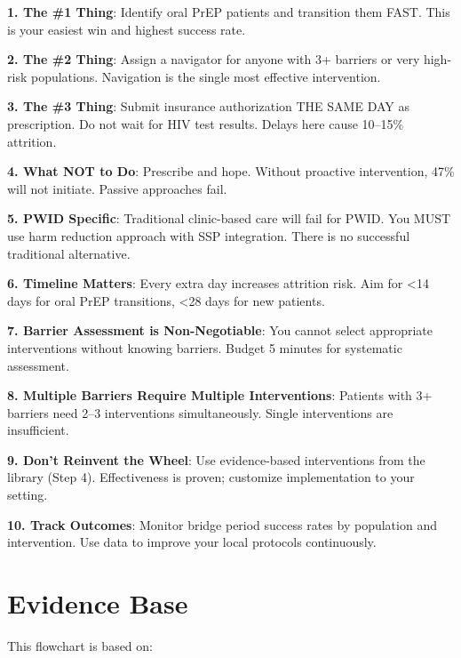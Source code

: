 \documentclass[11pt]{article}
\begin{document}
\begin{tcolorbox}[colback=yellow!10!white,colframe=yellow!75!black,title=\textbf{Top 10 Implementation Insights},breakable]

\textbf{1. The \#1 Thing}: Identify oral PrEP patients and transition them FAST. This is your easiest win and highest success rate.

\textbf{2. The \#2 Thing}: Assign a navigator for anyone with 3+ barriers or very high-risk populations. Navigation is the single most effective intervention.

\textbf{3. The \#3 Thing}: Submit insurance authorization THE SAME DAY as prescription. Do not wait for HIV test results. Delays here cause 10--15\% attrition.

\textbf{4. What NOT to Do}: Prescribe and hope. Without proactive intervention, 47\% will not initiate. Passive approaches fail.

\textbf{5. PWID Specific}: Traditional clinic-based care will fail for PWID. You MUST use harm reduction approach with SSP integration. There is no successful traditional alternative.

\textbf{6. Timeline Matters}: Every extra day increases attrition risk. Aim for <14 days for oral PrEP transitions, <28 days for new patients.

\textbf{7. Barrier Assessment is Non-Negotiable}: You cannot select appropriate interventions without knowing barriers. Budget 5 minutes for systematic assessment.

\textbf{8. Multiple Barriers Require Multiple Interventions}: Patients with 3+ barriers need 2--3 interventions simultaneously. Single interventions are insufficient.

\textbf{9. Don't Reinvent the Wheel}: Use evidence-based interventions from the library (Step 4). Effectiveness is proven; customize implementation to your setting.

\textbf{10. Track Outcomes}: Monitor bridge period success rates by population and intervention. Use data to improve your local protocols continuously.
\end{tcolorbox}

\section{Evidence Base}

This flowchart is based on:
\end{document}
